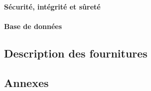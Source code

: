 \documentclass[asi]{picINSA}
\begin{document}
\subsection{Sécurité, intégrité et sûreté}



\subsection{Base de données}

\chapter{Description des fournitures}

\begin{appendix}
\part*{Annexes}

\listoffigures
{}
	 
\listoftables
{}
\end{appendix}
\pageQuatriemeCouverture
\end{document}
